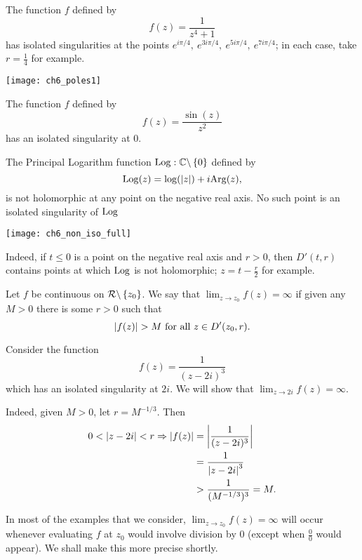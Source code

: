 \begin{example}
The function $f$ defined by
\[
f(z) = \frac{1}{z^4+1}
\]
has isolated singularities at the points $e^{i\pi/4},\ e^{3i\pi/4},\ e^{5i\pi/4},\ e^{7i\pi/4}$; in each case, take $r = \frac{1}{4}$ for example.
\begin{center}
\texttt{[image: ch6\_poles1]}
\end{center}

\end{example}
\begin{example}
The function $f$ defined by
\[
f(z) = \frac{\sin (z)}{z^2}
\]
has an isolated singularity at $0$.
\end{example}
\begin{example}
The Principal Logarithm function $\operatorname{Log} : \mathbb{C} \backslash \left\{0\right\}$ defined by
\[
\operatorname{Log} (z) = \log(\left| z \right|) + i \mathrm{Arg} (z),
\]
is not holomorphic at any point on the negative real axis.  No such point is an isolated singularity of $\operatorname{Log}$
\end{example}
\begin{blankbox}
\begin{center}
\texttt{[image: ch6\_non\_iso\_full]}
\end{center}
Indeed, if $t \leq 0$ is a point on the negative real axis and $r>0$, then $D'(t,r)$ contains points at which $\operatorname{Log}$ is not holomorphic; $z=t-\frac{r}{2}$ for example.
\end{blankbox}
\begin{definition}  
Let $f$ be continuous on $\mathcal{R} \backslash \left\{z_0\right\}$. We say that $\displaystyle \lim_{z \to z_0} f(z) = \infty$ if given any $M>0$ there is some $r>0$ such that
\[
\abs{f(z)}>M \text{ for all } z \in D'(z_0,r).
\]
\end{definition}
\begin{example}

Consider the function
\[
f(z) = \frac{1}{(z-2i)^3}
\]
which has an isolated singularity at $2i$.  We will show that $\displaystyle \lim_{z \to 2i} f(z) = \infty$.
\end{example}
\begin{solution}

Indeed, given $M>0$, let $r=M^{-1/3}$.  Then 
\begin{align*}
0 < \left| z-2i \right| < r \Rightarrow \left| f(z) \right| &= \left| \frac{1}{(z-2i)^3} \right|\\
& = \frac{1}{\left| z-2i \right|^3} \\
& > \frac{1}{(M^{-1/3})^3} = M.
\end{align*}
\end{solution}
In most of the examples that we consider, $\displaystyle \lim_{z \to z_0} f(z) = \infty$ will occur whenever evaluating $f$ at $z_0$ would involve division by $0$ (except when $\frac{0}{0}$ would appear).  We shall make this more precise shortly.

